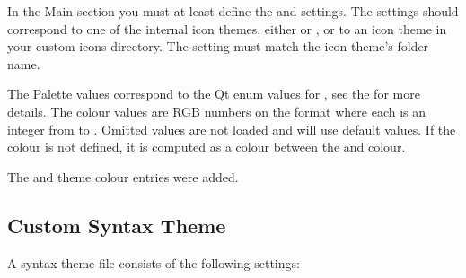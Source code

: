 \documentclass[a4paper,11pt,english]{sphinxmanual}
\begin{document}
\sphinxAtStartPar
In the Main section you must at least define the  and  settings. The
 settings should correspond to one of the internal icon themes, either
 or , or to an icon theme in your custom icons directory. The
setting must match the icon theme’s folder name.

\sphinxAtStartPar
The Palette values correspond to the Qt enum values for , see the
 for more details. The
colour values are RGB numbers on the format  where each is an integer from  to
. Omitted values are not loaded and will use default values. If the  colour is
not defined, it is computed as a colour between the  and  colour.

\sphinxAtStartPar
{}The  and  theme colour entries were added.


\subsection{Custom Syntax Theme}
\label{\detokenize{more_customise:custom-syntax-theme}}
\sphinxAtStartPar
A syntax theme  file consists of the following settings:
\end{document}
